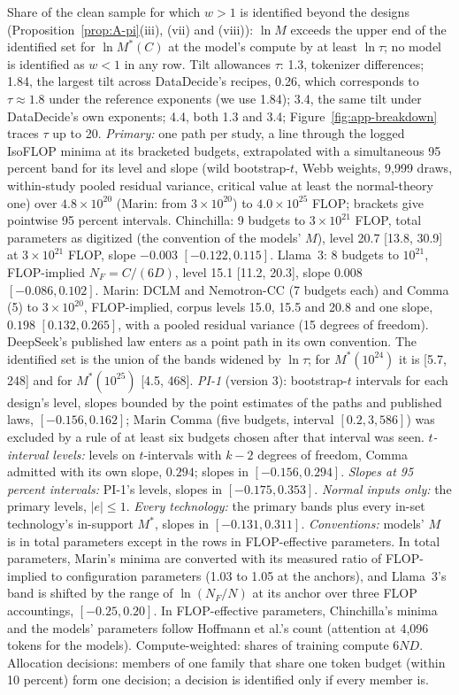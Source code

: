 \begin{table}[tp]
\begin{tablenotes}
Share of the clean sample for which $w>1$ is identified beyond the designs (Proposition~\ref{prop:A-pi}(iii), (vii) and (viii)): $\ln M$ exceeds the upper end of the identified set for $\ln M^*(C)$ at the model's compute by at least $\ln\tau$; no model is identified as $w<1$ in any row. Tilt allowances $\tau$: 1.3, tokenizer differences; 1.84, the largest tilt across DataDecide's recipes, 0.26, which corresponds to $\tau\approx1.8$ under the reference exponents (we use 1.84); 3.4, the same tilt under DataDecide's own exponents; 4.4, both 1.3 and 3.4; Figure~\ref{fig:app-breakdown} traces $\tau$ up to 20. \textit{Primary:} one path per study, a line through the logged IsoFLOP minima at its bracketed budgets, extrapolated with a simultaneous 95 percent band for its level and slope (wild bootstrap-$t$, Webb weights, 9,999 draws, within-study pooled residual variance, critical value at least the normal-theory one) over $4.8\times10^{20}$ (Marin: from $3\times10^{20}$) to $4.0\times10^{25}$ FLOP; brackets give pointwise 95 percent intervals. Chinchilla: 9 budgets to $3\times10^{21}$ FLOP, total parameters as digitized (the convention of the models' $M$), level 20.7 [13.8, 30.9] at $3\times10^{21}$ FLOP, slope $-0.003$ $[-0.122,0.115]$. Llama~3: 8 budgets to $10^{21}$, FLOP-implied $N_F=C/(6D)$, level 15.1 [11.2, 20.3], slope $0.008$ $[-0.086,0.102]$. Marin: DCLM and Nemotron-CC (7 budgets each) and Comma (5) to $3\times10^{20}$, FLOP-implied, corpus levels 15.0, 15.5 and 20.8 and one slope, $0.198$ $[0.132,0.265]$, with a pooled residual variance (15 degrees of freedom). DeepSeek's published law enters as a point path in its own convention. The identified set is the union of the bands widened by $\ln\tau$; for $M^*(10^{24})$ it is [5.7, 248] and for $M^*(10^{25})$ [4.5, 468]. \textit{PI-1} (version 3): bootstrap-$t$ intervals for each design's level, slopes bounded by the point estimates of the paths and published laws, $[-0.156,0.162]$; Marin Comma (five budgets, interval $[0.2,3{,}586]$) was excluded by a rule of at least six budgets chosen after that interval was seen. \textit{$t$-interval levels:} levels on $t$-intervals with $k-2$ degrees of freedom, Comma admitted with its own slope, $0.294$; slopes in $[-0.156,0.294]$. \textit{Slopes at 95 percent intervals:} PI-1's levels, slopes in $[-0.175,0.353]$. \textit{Normal inputs only:} the primary levels, $|e|\le1$. \textit{Every technology:} the primary bands plus every in-set technology's in-support $M^*$, slopes in $[-0.131,0.311]$. \textit{Conventions:} models' $M$ is in total parameters except in the rows in FLOP-effective parameters. In total parameters, Marin's minima are converted with its measured ratio of FLOP-implied to configuration parameters (1.03 to 1.05 at the anchors), and Llama~3's band is shifted by the range of $\ln(N_F/N)$ at its anchor over three FLOP accountings, $[-0.25,0.20]$. In FLOP-effective parameters, Chinchilla's minima and the models' parameters follow Hoffmann et al.'s count (attention at 4,096 tokens for the models). Compute-weighted: shares of training compute $6ND$. Allocation decisions: members of one family that share one token budget (within 10 percent) form one decision; a decision is identified only if every member is.

\end{tablenotes}
\end{table}
